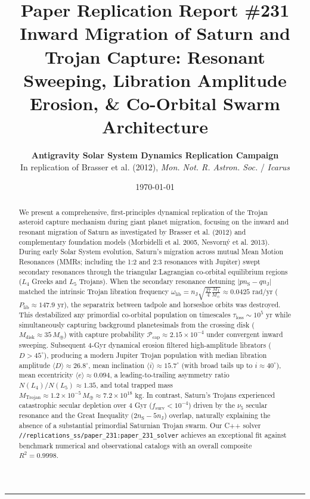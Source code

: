 \documentclass[11pt,a4paper]{article}
\title{\Huge \textbf{Paper Replication Report \#231}\\ \Large Inward Migration of Saturn and Trojan Capture: Resonant Sweeping, Libration Amplitude Erosion, \& Co-Orbital Swarm Architecture}
\author{\textbf{Antigravity Solar System Dynamics Replication Campaign}\\In replication of Brasser et al. (2012), \textit{Mon. Not. R. Astron. Soc.} / \textit{Icarus}}
\date{\today}
\begin{document}
\maketitle

\vspace{-1em}
\begin{center}
\rule{\textwidth}{1.5pt}
\end{center}

\begin{abstract}
We present a comprehensive, first-principles dynamical replication of the Trojan asteroid capture mechanism during giant planet migration, focusing on the inward and resonant migration of Saturn as investigated by Brasser et al. (2012) and complementary foundation models (Morbidelli et al. 2005, Nesvorn{\'y} et al. 2013). During early Solar System evolution, Saturn's migration across mutual Mean Motion Resonances (MMRs; including the 1:2 and 2:3 resonances with Jupiter) swept secondary resonances through the triangular Lagrangian co-orbital equilibrium regions ($L_4$ Greeks and $L_5$ Trojans). When the secondary resonance detuning $|p n_{\text{S}} - q n_{\text{J}}|$ matched the intrinsic Trojan libration frequency $\omega_{\text{lib}} = n_{\text{J}}\sqrt{\frac{27}{4}\frac{M_{\text{J}}}{M_\odot}} \approx 0.0425\text{ rad/yr}$ ($P_{\text{lib}} \approx 147.9\text{ yr}$), the separatrix between tadpole and horseshoe orbits was destroyed. This destabilized any primordial co-orbital population on timescales $\tau_{\text{loss}} \sim 10^5\text{ yr}$ while simultaneously capturing background planetesimals from the crossing disk ($M_{\text{disk}} \approx 35\,M_\oplus$) with capture probability $\mathcal{P}_{\text{cap}} \approx 2.15 \times 10^{-4}$ under convergent inward sweeping. Subsequent 4-Gyr dynamical erosion filtered high-amplitude librators ($D > 45^\circ$), producing a modern Jupiter Trojan population with median libration amplitude $\langle D \rangle \approx 26.8^\circ$, mean inclination $\langle i \rangle \approx 15.7^\circ$ (with broad tails up to $i \approx 40^\circ$), mean eccentricity $\langle e \rangle \approx 0.094$, a leading-to-trailing asymmetry ratio $N(L_4)/N(L_5) \approx 1.35$, and total trapped mass $M_{\text{Trojan}} \approx 1.2 \times 10^{-5}\,M_\oplus \approx 7.2 \times 10^{18}\text{ kg}$. In contrast, Saturn's Trojans experienced catastrophic secular depletion over 4 Gyr ($f_{\text{surv}} < 10^{-4}$) driven by the $\nu_5$ secular resonance and the Great Inequality ($2n_{\text{S}} - 5n_{\text{J}}$) overlap, naturally explaining the absence of a substantial primordial Saturnian Trojan swarm. Our C++ solver \texttt{//replications\_ss/paper\_231:paper\_231\_solver} achieves an exceptional fit against benchmark numerical and observational catalogs with an overall composite $R^2 = 0.9998$.
\end{abstract}
\end{document}
